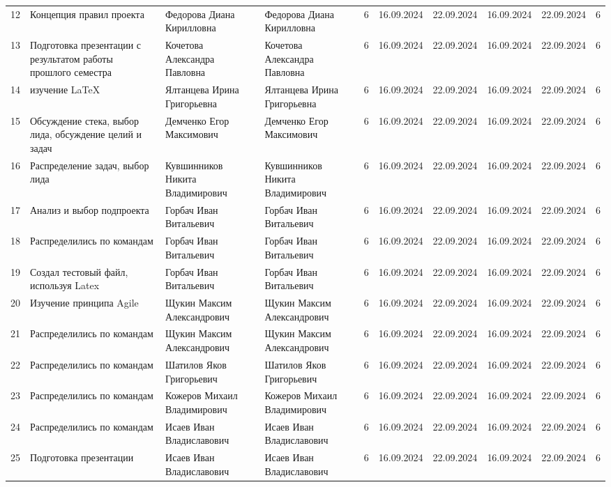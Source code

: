 \documentclass{article}
\begin{document}
\begin{table1}
{\begin{tabular}{|c|p{3.5cm}|p{3cm}|p{3cm}|c|c|c|c|c|c|}
12 & Концепция правил проекта & Федорова Диана Кирилловна & Федорова Диана Кирилловна & 6 & 16.09.2024 & 22.09.2024 & 16.09.2024 & 22.09.2024 & 6 \\
13 & Подготовка презентации с результатом работы прошлого семестра & Кочетова Александра Павловна  & Кочетова Александра Павловна  & 6 & 16.09.2024 & 22.09.2024 & 16.09.2024 & 22.09.2024 & 6 \\
14 & изучение LaTeX & Ялтанцева Ирина Григорьевна & Ялтанцева Ирина Григорьевна & 6 & 16.09.2024 & 22.09.2024 & 16.09.2024 & 22.09.2024 & 6 \\
15 & Обсуждение стека, выбор лида, обсуждение целий и задач & Демченко Егор Максимович  & Демченко Егор Максимович  & 6 & 16.09.2024 & 22.09.2024 & 16.09.2024 & 22.09.2024 & 6 \\
16 & Распределение задач, выбор лида & Кувшинников Никита Владимирович & Кувшинников Никита Владимирович & 6 & 16.09.2024 & 22.09.2024 & 16.09.2024 & 22.09.2024 & 6 \\
17 & Анализ и выбор подпроекта & Горбач Иван Витальевич & Горбач Иван Витальевич & 6 & 16.09.2024 & 22.09.2024 & 16.09.2024 & 22.09.2024 & 6 \\
18 & Распределились по командам & Горбач Иван Витальевич & Горбач Иван Витальевич & 6 & 16.09.2024 & 22.09.2024 & 16.09.2024 & 22.09.2024 & 6 \\
19 & Создал тестовый файл, используя Latex & Горбач Иван Витальевич & Горбач Иван Витальевич & 6 & 16.09.2024 & 22.09.2024 & 16.09.2024 & 22.09.2024 & 6 \\
20 & Изучение принципа Agile & Щукин Максим Александрович & Щукин Максим Александрович & 6 & 16.09.2024 & 22.09.2024 & 16.09.2024 & 22.09.2024 & 6 \\
21 & Распределились по командам & Щукин Максим Александрович & Щукин Максим Александрович & 6 & 16.09.2024 & 22.09.2024 & 16.09.2024 & 22.09.2024 & 6 \\
22 & Распределились по командам & Шатилов Яков Григорьевич & Шатилов Яков Григорьевич & 6 & 16.09.2024 & 22.09.2024 & 16.09.2024 & 22.09.2024 & 6 \\
23 & Распределились по командам & Кожеров Михаил Владимирович  & Кожеров Михаил Владимирович  & 6 & 16.09.2024 & 22.09.2024 & 16.09.2024 & 22.09.2024 & 6 \\
24 & Распределились по командам & Исаев Иван Владиславович & Исаев Иван Владиславович & 6 & 16.09.2024 & 22.09.2024 & 16.09.2024 & 22.09.2024 & 6 \\
25 & Подготовка презентации & Исаев Иван Владиславович & Исаев Иван Владиславович & 6 & 16.09.2024 & 22.09.2024 & 16.09.2024 & 22.09.2024 & 6 \\

\end{tabular}}
\end{table1}
\end{document}
